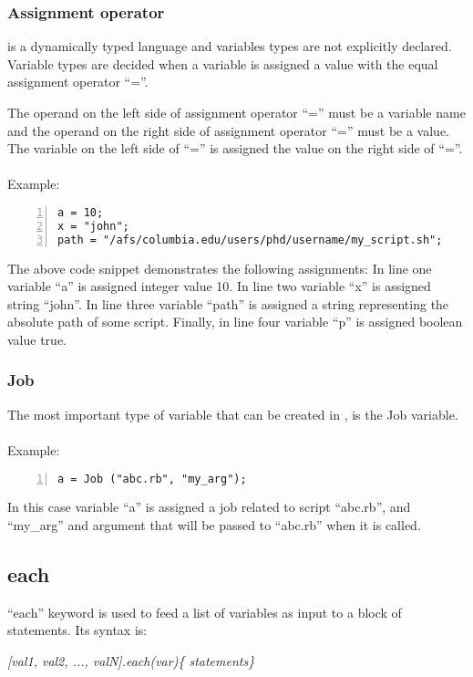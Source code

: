 \subsubsection*{Assignment operator}
\lang{}  is a dynamically typed language and variables types are not explicitly declared.
Variable types are decided when a variable is assigned a value with the equal
assignment operator ``=''.

The operand on the left side of assignment operator ``='' must be a variable name
and the operand on the right side of assignment operator ``='' must be a value.
The variable on the left side of ``='' is assigned the value on the right side
of ``=''.\\
\\
Example:
\begin{Verbatim}[numbers=left]
a = 10;
x = "john";
path = "/afs/columbia.edu/users/phd/username/my_script.sh";
\end{Verbatim}

The above code snippet demonstrates the following assignments:
In line one variable ``a'' is assigned integer value 10.
In line two variable ``x'' is assigned string ``john''.
In line three variable ``path'' is assigned a string representing the absolute
path of some script.
Finally, in line four variable ``p'' is assigned boolean value true.

\subsubsection*{Job}
The most important type of variable that can be created in \lang{}, is the
Job variable.\\
\\
Example:
\begin{Verbatim}[numbers=left]
a = Job ("abc.rb", "my_arg");
\end{Verbatim}
In this case variable ``a'' is assigned a job related to script ``abc.rb'', and ``my\_arg'' and argument that will be passed to ``abc.rb'' when it is called.

\subsection*{each}

\noindent ``each'' keyword is used to feed a list of variables as input
to a block of statements. Its syntax is:

\textit{[val1, val2, ..., valN].each(var)\{ statements\}}\\


